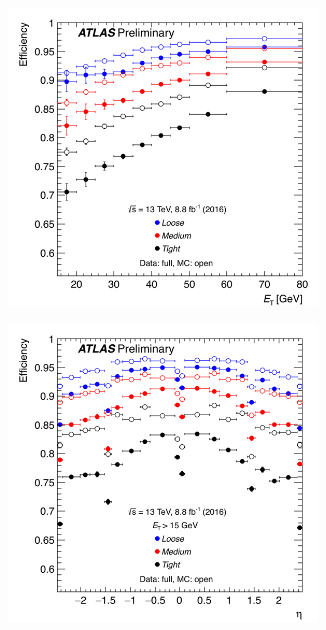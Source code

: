 \begin{figure}[h!]
\begin{subfigure}{0.5\textwidth}
  \centering
  \includegraphics[width=0.9\textwidth]{figures/Objects/effeleet.png}
  \caption{}
  \label{sec:obj:fig:eleeffet}
\end{subfigure}
\begin{subfigure}{0.5\textwidth}
  \centering
  \includegraphics[width=0.9\textwidth]{figures/Objects/eleeffeta.png}
  \caption{}

\end{subfigure}
\end{figure}
